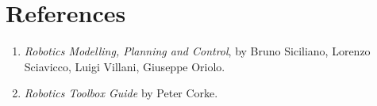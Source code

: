 \documentclass[12pt]{report}
\begin{document}
		\chapter*{References}

		\begin{enumerate}
			\item \textit{Robotics Modelling, Planning and Control}, by Bruno Siciliano, Lorenzo Sciavicco, Luigi Villani, Giuseppe Oriolo.
			\item \textit{Robotics Toolbox Guide} by Peter Corke.
		\end{enumerate}
		

		
\end{document}
